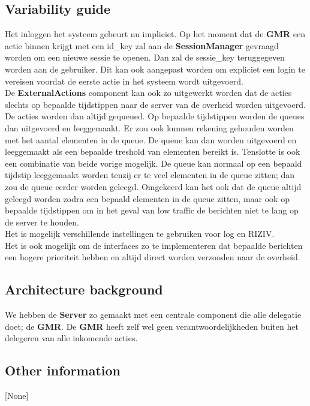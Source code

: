 \documentclass[a4paper,10pt]{article}
\begin{document}
\subsection{Variability guide}
Het inloggen het systeem gebeurt nu impliciet.  Op het moment dat de \textbf{GMR} een actie binnen krijgt met een id\_key zal aan de \textbf{SessionManager} gevraagd worden om een nieuwe sessie te openen.  Dan zal de sessie\_key teruggegeven worden aan de gebruiker.  Dit kan ook aangepast worden om expliciet een login te vereisen voordat de eerste actie in het systeem wordt uitgevoerd.\\
De \textbf{ExternalActions} component kan ook zo uitgewerkt worden dat de acties slechts op bepaalde tijdstippen naar de server van de overheid worden uitgevoerd.  De acties worden dan altijd gequeued.  Op bepaalde tijdstippen worden de queues dan uitgevoerd en leeggemaakt.  Er zou ook kunnen rekening gehouden worden met het aantal elementen in de queue.  De queue kan dan worden uitgevoerd en leeggemaakt als een bepaalde treshold van elementen bereikt is.  Tenslotte is ook een combinatie van beide vorige mogelijk.  De queue kan normaal op een bepaald tijdstip leeggemaakt worden tenzij er te veel elementen in de queue zitten; dan zou de queue eerder worden geleegd.  Omgekeerd kan het ook dat de queue altijd geleegd worden zodra een bepaald elementen in de queue zitten, maar ook op bepaalde tijdstippen om in het geval van low traffic de berichten niet te lang op de server te houden.\\
Het is mogelijk verschillende instellingen te gebruiken voor log en RIZIV.\\
Het is ook mogelijk om de interfaces zo te implementeren dat bepaalde berichten een hogere prioriteit hebben en altijd direct worden verzonden naar de overheid.

\subsection{Architecture background}
We hebben de \textbf{Server} zo gemaakt met een centrale component die alle delegatie doet; de \textbf{GMR}.  De \textbf{GMR} heeft zelf wel geen verantwoordelijkheden buiten het delegeren van alle inkomende acties.

\subsection{Other information}
[None]
\end{document}
